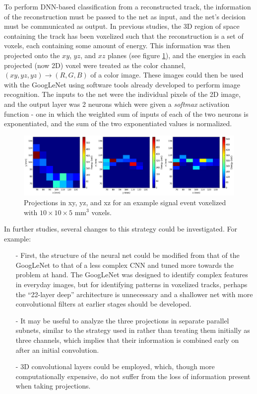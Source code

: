 \documentclass[11pt,a4paper]{article}
\begin{document}
To perform DNN-based classification from a reconstructed track, the information of the reconstruction must be passed to the net as input, and the net's decision must be communicated as output. In previous studies, the 3D region of space containing the track has been voxelized such that the reconstruction is a set of voxels, each containing some amount of energy. This information was then projected onto the $xy$, $yz$, and $xz$ planes (see figure \ref{fig.projs10105}), and the energies in each projected (now 2D) voxel were treated as the color channel, $(xy, yz, yz) \rightarrow (R, G, B)$ of a color image. These images could then be used with the GoogLeNet using software tools already developed to perform image recognition. The inputs to the net were the individual pixels of the 2D image, and the output layer was 2 neurons which were given a \emph{softmax} activation function - one in which the weighted sum of inputs of each of the two neurons is exponentiated, and the sum of the two exponentiated values is normalized. 

\begin{figure}[!htb]
	\centering
	\includegraphics[scale=0.4]{fig/plt_h2D_dnn_NEXT100_0vbb_si_v10x10x5_r200x200x200_6_si.png}
	\caption{\label{fig.projs10105}Projections in xy, yz, and xz for an example signal event voxelized with $10 \times 10 \times 5$ mm$^3$ voxels.}
\end{figure}

In further studies, several changes to this strategy could be investigated. For example:

\begin{enumerate}[itemsep=-1mm]
	\item[-] First, the structure of the neural net could be modified from that of the GoogLeNet to that of a less complex CNN and tuned more towards the problem at hand. The GoogLeNet was designed to identify complex features in everyday images, but for identifying patterns in voxelized tracks, perhaps the ``22-layer deep'' architecture is unnecessary and a shallower net with more convolutional filters at earlier stages should be developed. 
	\item[-] It may be useful to analyze the three projections in separate parallel subnets, similar to the strategy used in \cite{Aurisano_2016} rather than treating them initially as three channels, which implies that their information is combined early on after an initial convolution. 
	\item[-] 3D convolutional layers could be employed, which, though more computationally expensive, do not suffer from the loss of information present when taking projections.
\end{enumerate}
\end{document}
